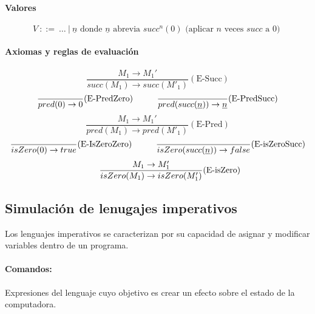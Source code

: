 \paragraph{Valores}
$$V~::=~\dots~|~\underline{n}\text{ donde } \underline{n} \text{ abrevia } succ^n(0) \text{ (aplicar $n$ veces $succ$ a $0$) }$$

\paragraph{Axiomas y reglas de evaluación}

\begin{equation*}
		\frac{M_1\to M_1'}{succ(M_1)\to succ(M'_1)}(\text{E-Succ})
	\end{equation*}
	\vspace*{5mm}
	\begin{equation*}
		\frac{}{pred(0)\to 0}(\text{E-PredZero})\hspace*{1cm}\frac{}{pred(succ(\underline{n}))\to \underline{n}}(\text{E-PredSucc})
	\end{equation*}
	\vspace*{5mm}
	\begin{equation*}
		\frac{M_1\to M_1'}{pred(M_1)\to pred(M'_1)}(\text{E-Pred})
	\end{equation*}
	\vspace*{5mm}
	\begin{equation*}
		\frac{}{isZero(0)\to true}(\text{E-IsZeroZero})\hspace*{1cm}\frac{}{isZero(succ(\underline{n}))\to false}(\text{E-isZeroSucc})
	\end{equation*}
	\vspace*{5mm}
	\begin{equation*}
		\hspace*{1cm}\frac{M_1\to M'_1}{isZero(M_1)\to isZero(M_1')}(\text{E-isZero})
	\end{equation*}



\subsection{Simulación de lenugajes imperativos}
Los lenguajes imperativos se caracterizan por su capacidad de asignar y modificar variables dentro de un programa.

\paragraph{Comandos:} Expresiones del lenguaje cuyo objetivo es crear un efecto sobre el estado de la computadora. 

